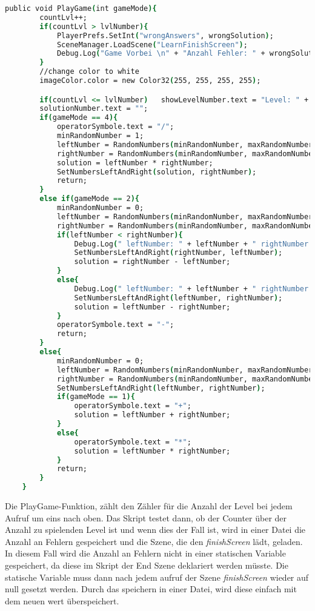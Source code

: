 \begin{lstlisting}[language=csh, caption={MathOperations.cs PlayGame-Funktion}]
public void PlayGame(int gameMode){
		countLvl++;
		if(countLvl > lvlNumber){
			PlayerPrefs.SetInt("wrongAnswers", wrongSolution);
			SceneManager.LoadScene("LearnFinishScreen");
			Debug.Log("Game Vorbei \n" + "Anzahl Fehler: " + wrongSolution);
		}
		//change color to white
		imageColor.color = new Color32(255, 255, 255, 255);

		if(countLvl <= lvlNumber)	showLevelNumber.text = "Level: " + countLvl + "/" + lvlNumber;
		solutionNumber.text = "";
		if(gameMode == 4){
			operatorSymbole.text = "/";
			minRandomNumber = 1;
			leftNumber = RandomNumbers(minRandomNumber, maxRandomNumber);
			rightNumber = RandomNumbers(minRandomNumber, maxRandomNumber);
			solution = leftNumber * rightNumber;
			SetNumbersLeftAndRight(solution, rightNumber);
			return;
		}
		else if(gameMode == 2){
			minRandomNumber = 0;
			leftNumber = RandomNumbers(minRandomNumber, maxRandomNumber);
			rightNumber = RandomNumbers(minRandomNumber, maxRandomNumber);
			if(leftNumber < rightNumber){
				Debug.Log(" leftNumber: " + leftNumber + " rightNumber: " + rightNumber + "zweite If");
				SetNumbersLeftAndRight(rightNumber, leftNumber);
				solution = rightNumber - leftNumber;
			}
			else{
				Debug.Log(" leftNumber: " + leftNumber + " rightNumber: " + rightNumber + "zweite If");
				SetNumbersLeftAndRight(leftNumber, rightNumber);
				solution = leftNumber - rightNumber;
			}
			operatorSymbole.text = "-";
			return;
		}
		else{
			minRandomNumber = 0;
			leftNumber = RandomNumbers(minRandomNumber, maxRandomNumber);
			rightNumber = RandomNumbers(minRandomNumber, maxRandomNumber);
			SetNumbersLeftAndRight(leftNumber, rightNumber);
			if(gameMode == 1){
				operatorSymbole.text = "+";
				solution = leftNumber + rightNumber;
			}
			else{
				operatorSymbole.text = "*";
				solution = leftNumber * rightNumber;
			}
			return;
		}
	}
\end{lstlisting}
Die PlayGame-Funktion, zählt den Zähler für die Anzahl der Level bei jedem Aufruf um eins nach oben. Das Skript testet dann, ob der Counter über der Anzahl zu spielenden Level ist und wenn dies der Fall ist, wird in einer Datei die Anzahl an Fehlern gespeichert und die Szene, die den \textit{finishScreen} lädt, geladen. In diesem Fall wird die Anzahl an Fehlern nicht in einer statischen Variable gespeichert, da diese im Skript der End Szene deklariert werden müsste. Die statische Variable muss dann nach jedem aufruf der Szene \textit{finishScreen} wieder auf null gesetzt werden. Durch das speichern in einer Datei, wird diese einfach mit dem neuen wert überspeichert.\\

